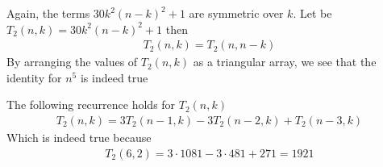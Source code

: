 Again, the terms $30k^2(n-k)^2 + 1$ are symmetric over $k$.
Let be $T_2 (n,k) = 30k^2(n-k)^2 + 1$ then
\begin{align*}
    T_2 (n,k) = T_2 (n,n-k)
\end{align*}
By arranging the values of $T_{2} (n,k)$ as a triangular array, we see that the identity for $n^5$ is indeed true

The following recurrence holds for $T_2 (n,k)$
\begin{align*}
    T_2 (n, k) = 3T_2(n-1, k) - 3T_2(n-2, k) + T_2(n-3, k)
\end{align*}
Which is indeed true because
\begin{align*}
    T_2 (6,2) = 3 \cdot 1081 - 3 \cdot 481 + 271 = 1921
\end{align*}

